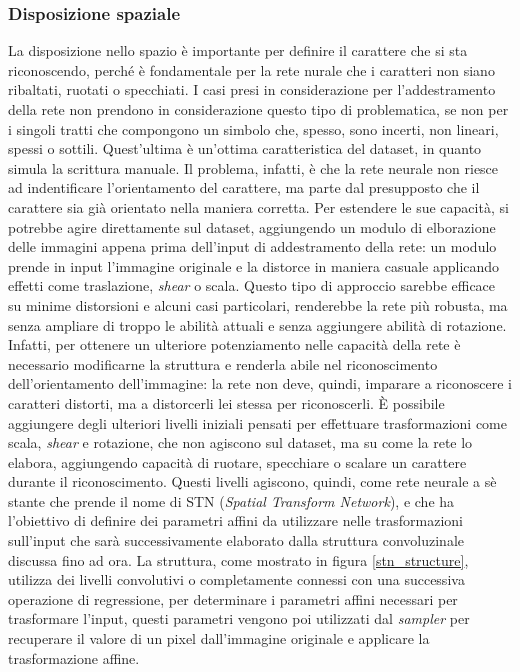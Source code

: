 \documentclass[a4paper,12pt]{article}
\begin{document}
\subsubsection{Disposizione spaziale}
\label{disposizione_spaziale}
La disposizione nello spazio è importante per definire il carattere che si sta riconoscendo, perché è fondamentale per la rete nurale che i caratteri non siano ribaltati, ruotati o specchiati. I casi presi in considerazione per l'addestramento della rete non prendono in considerazione questo tipo di problematica, se non per i singoli tratti che compongono un simbolo che, spesso, sono incerti, non lineari, spessi o sottili. Quest'ultima è un'ottima caratteristica del dataset, in quanto simula la scrittura manuale. Il problema, infatti, è che la rete neurale non riesce ad indentificare l'orientamento del carattere, ma parte dal presupposto che il carattere sia già orientato nella maniera corretta. %
Per estendere le sue capacità, si potrebbe agire direttamente sul dataset, aggiungendo un modulo di elborazione delle immagini appena prima dell'input di addestramento della rete: un modulo prende in input l'immagine originale e la distorce in maniera casuale applicando effetti come traslazione, \textit{shear} o scala. Questo tipo  di approccio sarebbe efficace su minime distorsioni e alcuni casi particolari, renderebbe la rete più robusta, ma senza ampliare di troppo le abilità attuali e senza aggiungere abilità di rotazione.
Infatti, per ottenere un ulteriore potenziamento nelle capacità della rete è necessario modificarne la struttura e renderla abile nel riconoscimento dell'orientamento dell'immagine: la rete non deve, quindi, imparare a riconoscere i caratteri distorti, ma a distorcerli lei stessa per riconoscerli.
È possibile aggiungere degli ulteriori livelli iniziali pensati per effettuare trasformazioni come scala, \textit{shear} e rotazione, che non agiscono sul dataset, ma su come la rete lo elabora, aggiungendo capacità di ruotare, specchiare o scalare un carattere durante il riconoscimento.
Questi livelli agiscono, quindi, come rete neurale a sè stante che prende il nome di STN (\textit{Spatial Transform Network}), e che ha l'obiettivo di definire dei parametri affini da utilizzare nelle trasformazioni sull'input che sarà successivamente elaborato dalla struttura convoluzinale discussa fino ad ora.
La struttura, come mostrato in figura \ref{stn_structure}, utilizza dei livelli convolutivi o completamente connessi con una successiva operazione di regressione, per determinare i parametri affini necessari per trasformare l'input, questi parametri vengono poi utilizzati dal \textit{sampler} per recuperare il valore di un pixel dall'immagine originale e applicare la trasformazione affine.
\end{document}
